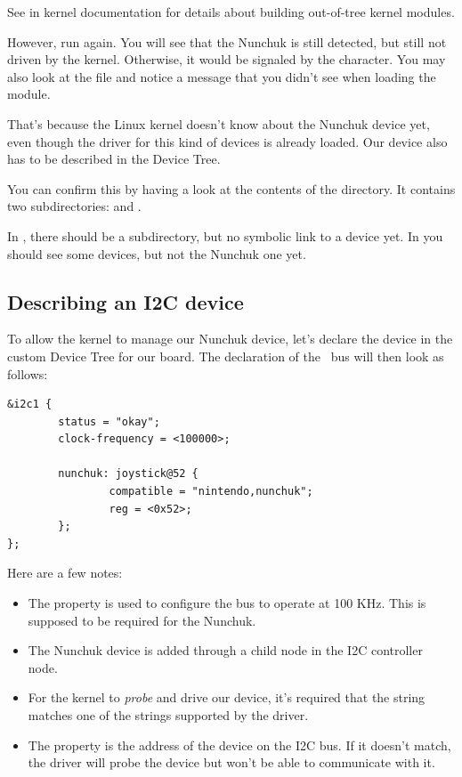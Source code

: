 {See  in kernel documentation
for details about building out-of-tree kernel modules.

However, run  again. You will see that the
Nunchuk is still detected, but still not driven by the kernel.
Otherwise, it would be signaled by the  character. You
may also look at the  file and notice a
 message that you didn't
see when loading the module.

That's because the Linux kernel doesn't know about the Nunchuk
device yet, even though the driver for this kind of devices is
already loaded. Our device also has to be described in the Device Tree.

You can confirm this by having a look at the contents of the
 directory.  It contains two subdirectories:
 and .

In , there should be a  subdirectory,
but no symbolic link to a device yet. In  you should
see some devices, but not the Nunchuk one yet.

\subsection{Describing an I2C device}

To allow the kernel to manage our Nunchuk device, let's declare the
device in the custom Device Tree for our board. The declaration of the \busname\ 
bus will then look as follows:

\begin{verbatim}
&i2c1 {
        status = "okay";
        clock-frequency = <100000>;

        nunchuk: joystick@52 {
                compatible = "nintendo,nunchuk";
                reg = <0x52>;
        };
};
\end{verbatim}

Here are a few notes:
\begin{itemize}
\item The  property is used to configure the bus
      to operate at 100 KHz. This is supposed to be required for the
      Nunchuk.
\item The Nunchuk device is added through a child node in the I2C
      controller node.
\item For the kernel to {\em probe} and drive our device, it's required
      that the  string matches one of the
      \code{compatible} strings supported by the driver.
\item The  property is the address of the device on the
      I2C bus. If it doesn't match, the driver will probe the device
      but won't be able to communicate with it.
\end{itemize}

}

